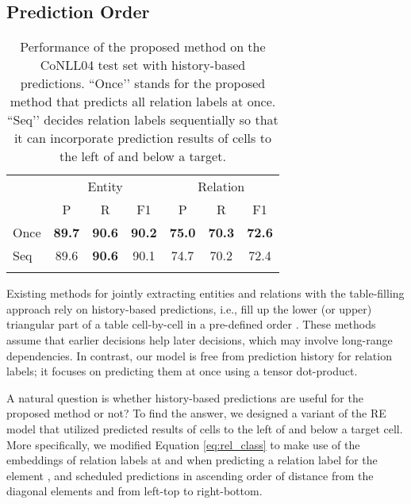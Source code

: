 \documentclass[11pt,a4paper]{article}
\begin{document}
\subsection{Prediction Order}

\begin{table}[t]
    \centering
    \small
    \begin{tabular}{lcccccc}
    \Xhline{3\arrayrulewidth} 
     \multicolumn{1}{c}{\multirow{2}{*}{Order}}  & \multicolumn{3}{c}{Entity}& \multicolumn{3}{c}{Relation}\\
        \cline{2-7}
         & P & R & F1 & P & R & F1\\
    \Xhline{2\arrayrulewidth} 
         Once & \textbf{89.7} & \textbf{90.6} & \textbf{90.2} & \textbf{75.0} & \textbf{70.3} & \textbf{72.6} \\
         Seq & 89.6 & \textbf{90.6} & 90.1 & 74.7 & 70.2 & 72.4\\
    \Xhline{3\arrayrulewidth}
    \end{tabular}
    \caption{Performance of the proposed method on the CoNLL04 test set with history-based predictions. ``Once’’ stands for the proposed method that predicts all relation labels at once. ``Seq’’ decides relation labels sequentially so that it can incorporate prediction results of cells to the left of and below a target.}
    \label{tab:neighbor}
\end{table}

Existing methods for jointly extracting entities and relations with the table-filling approach rely on history-based predictions, i.e., fill up the lower (or upper) triangular part of a table cell-by-cell in a pre-defined order \cite{miwa-sasaki-2014-modeling,gupta-etal-2016-table,zhang-etal-2017-end}.
These methods assume that earlier decisions help later decisions, which may involve long-range dependencies.
In contrast, our model is free from prediction history for relation labels; it focuses on predicting them at once using a tensor dot-product.

A natural question is whether history-based predictions are useful for the proposed method or not?
To find the answer, we designed a variant of the RE model that utilized predicted results of cells to the left of and below a target cell.
More specifically, we modified Equation \ref{eq:rel_class} to make use of the embeddings of relation labels at  and  when predicting a relation label for the element , and scheduled predictions in ascending order of distance from the diagonal elements and from left-top to right-bottom.
\end{document}
